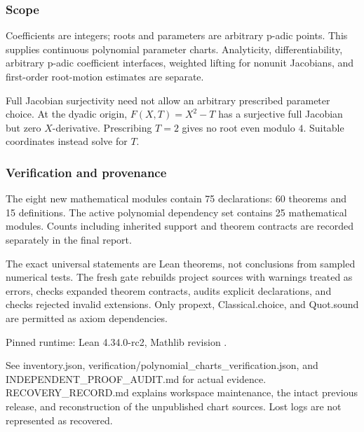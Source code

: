 \hypertarget{cont5:scope}{%
\subsubsection{Scope}\label{cont5:scope}}

Coefficients are integers; roots and parameters are arbitrary p-adic
points. This supplies continuous polynomial parameter charts.
Analyticity, differentiability, arbitrary p-adic coefficient interfaces,
weighted lifting for nonunit Jacobians, and first-order root-motion
estimates are separate.

Full Jacobian surjectivity need not allow an arbitrary prescribed
parameter choice. At the dyadic origin, \(F(X,T)=X^2-T\) has a
surjective full Jacobian but zero \(X\)-derivative. Prescribing \(T=2\)
gives no root even modulo \(4\). Suitable coordinates instead solve for
\(T\).

\hypertarget{cont5:verification-and-provenance}{%
\subsubsection{Verification and
provenance}\label{cont5:verification-and-provenance}}

The eight new mathematical modules contain 75 declarations: 60 theorems
and 15 definitions. The active polynomial dependency set contains 25
mathematical modules. Counts including inherited support and theorem
contracts are recorded separately in the final report.

The exact universal statements are Lean theorems, not conclusions from
sampled numerical tests. The fresh gate rebuilds project sources with
warnings treated as errors, checks expanded theorem contracts, audits
explicit declarations, and checks rejected invalid extensions. Only
propext, Classical.choice, and Quot.sound are permitted as axiom
dependencies.

Pinned runtime: Lean 4.34.0-rc2, Mathlib revision
.

See inventory.json, verification/polynomial\_charts\_verification.json,
and INDEPENDENT\_PROOF\_AUDIT.md for actual evidence.
RECOVERY\_RECORD.md explains workspace maintenance, the intact previous
release, and reconstruction of the unpublished chart sources. Lost logs
are not represented as recovered.

